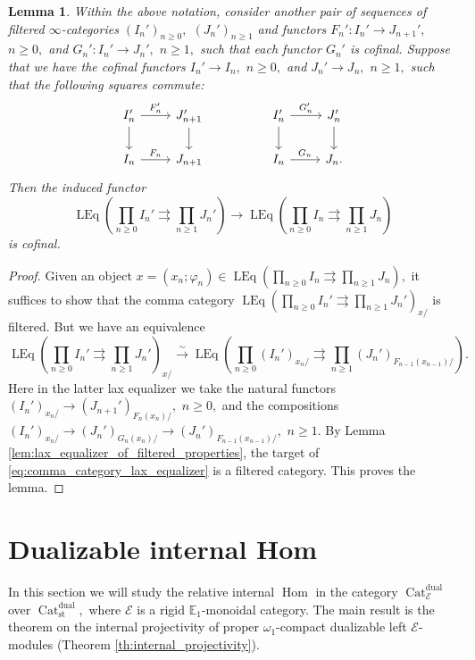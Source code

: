 \documentclass[11pt,leqno]{amsart}
\newtheorem{lemma}[theo]{Lemma}
\numberwithin{equation}{section}
\def\Hom{\operatorname{Hom}}
\newcommand{\prodd}[1][]{\mathop{\prod}\limits_{#1}}
\newcommand{\toto}{\rightrightarrows}
\newcommand{\xto}{\xrightarrow}
\newcommand{\Cat}{\operatorname{Cat}}
\newcommand{\st}{\operatorname{st}}
\newcommand{\dual}{\operatorname{dual}}
\newcommand{\bE}{{\mathbb E}}
\newcommand{\cE}{{\mathcal E}}
\newcommand{\LEq}{\operatorname{LEq}}
\begin{document}
\begin{lemma}\label{lem:functor_between_oplax_equalizers}
Within the above notation, consider another pair of sequences of filtered $\infty$-categories $(I_n')_{n\geq 0},$ $(J_n')_{n\geq 1}$ and functors $F_n':I_n'\to J_{n+1}',$ $n\geq 0,$ and $G_n':I_n'\to J_n',$ $n\geq 1,$ such that each functor $G_n'$ is cofinal. Suppose that we have the cofinal functors $I_n'\to I_n,$ $n\geq 0,$ and $J_n'\to J_n,$ $n\geq 1,$ such that the following squares commute:
\begin{equation*}
\begin{tikzcd}
I_n'\ar[r, "F_n'"] \ar[d] & J_{n+1}'\ar[d] & & I_n'\ar[r, "G_n'"] \ar[d] & J_n'\ar[d] \\
I_n\ar[r, "F_n"] & J_{n+1} & & I_n\ar[r, "G_n"] & J_n.
\end{tikzcd}
\end{equation*}
Then the induced functor
\begin{equation*}
\LEq(\prodd[n\geq 0] I_n'\toto \prodd[n\geq 1] J_n')\to \LEq(\prodd[n\geq 0] I_n\toto \prodd[n\geq 1] J_n)
\end{equation*}
is cofinal.
\end{lemma}

\begin{proof}
Given an object $x=(x_n;\varphi_n)\in \LEq(\prodd[n\geq 0] I_n\toto \prodd[n\geq 1] J_n),$ it suffices to show that the comma category $\LEq(\prodd[n\geq 0] I_n'\toto \prodd[n\geq 1] J_n')_{x/}$ is filtered. But we have an equivalence
\begin{equation}\label{eq:comma_category_lax_equalizer}
\LEq(\prodd[n\geq 0] I_n'\toto \prodd[n\geq 1] J_n')_{x/}\xto{\sim} \LEq(\prodd[n\geq 0] (I_n')_{x_n/} \toto \prodd[n\geq 1] (J_n')_{F_{n-1}(x_{n-1})/}).
\end{equation} 
Here in the latter lax equalizer we take the natural functors $(I_n')_{x_n/}\to (J_{n+1}')_{F_n(x_n)/},$ $n\geq 0,$ and the compositions $(I_n')_{x_n/}\to (J_n')_{G_n(x_n)/}\to (J_n')_{F_{n-1}(x_{n-1})/},$ $n\geq 1.$ By Lemma \ref{lem:lax_equalizer_of_filtered_properties}, the target of \eqref{eq:comma_category_lax_equalizer} is a filtered category. This proves the lemma.
\end{proof}

\section{Dualizable internal Hom}
\label{sec:dualizable_Hom}

In this section we will study the relative internal $\Hom$ in the category $\Cat_{\cE}^{\dual}$ over $\Cat_{\st}^{\dual},$ where $\cE$ is a rigid $\bE_1$-monoidal category. The main result is the theorem on the internal projectivity of proper $\omega_1$-compact dualizable left $\cE$-modules (Theorem \ref{th:internal_projectivity}).
\end{document}

